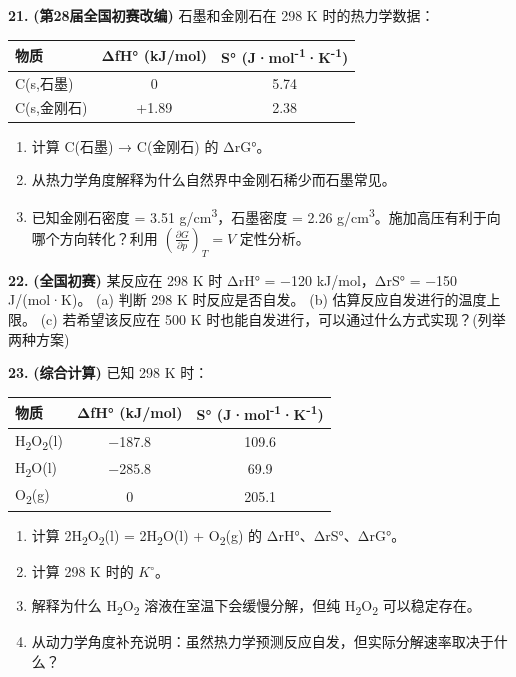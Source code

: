 \textbf{21.} \textbf{(第28届全国初赛改编)} 石墨和金刚石在 298 K 时的热力学数据：

{\def\LTcaptype{none} %
\begin{longtable}[]{@{}lcc@{}}
\toprule\noalign{}
物质 & ΔfH° (kJ/mol) & S° (J·mol\textsuperscript{-1}·K\textsuperscript{-1}) \\
\midrule\noalign{}
\endhead
\bottomrule\noalign{}
\endlastfoot
C(s,石墨) & 0 & 5.74 \\
C(s,金刚石) & +1.89 & 2.38 \\
\end{longtable}
}

\begin{enumerate}
\def\labelenumi{(\alph{enumi})}
\tightlist
\item
  计算 C(石墨) → C(金刚石) 的 ΔrG°。
\item
  从热力学角度解释为什么自然界中金刚石稀少而石墨常见。
\item
  已知金刚石密度 = 3.51 g/cm\textsuperscript{3}，石墨密度 = 2.26 g/cm\textsuperscript{3}。施加高压有利于向哪个方向转化？利用 \(\left(\frac{\partial G}{\partial p}\right)_T = V\) 定性分析。
\end{enumerate}

\textbf{22.} \textbf{(全国初赛)} 某反应在 298 K 时 ΔrH° = −120 kJ/mol，ΔrS° = −150 J/(mol·K)。
(a) 判断 298 K 时反应是否自发。
(b) 估算反应自发进行的温度上限。
(c) 若希望该反应在 500 K 时也能自发进行，可以通过什么方式实现？(列举两种方案)

\textbf{23.} \textbf{(综合计算)} 已知 298 K 时：

{\def\LTcaptype{none} %
\begin{longtable}[]{@{}lcc@{}}
\toprule\noalign{}
物质 & ΔfH° (kJ/mol) & S° (J·mol\textsuperscript{-1}·K\textsuperscript{-1}) \\
\midrule\noalign{}
\endhead
\bottomrule\noalign{}
\endlastfoot
H\textsubscript{2}O\textsubscript{2}(l) & −187.8 & 109.6 \\
H\textsubscript{2}O(l) & −285.8 & 69.9 \\
O\textsubscript{2}(g) & 0 & 205.1 \\
\end{longtable}
}

\begin{enumerate}
\def\labelenumi{(\alph{enumi})}
\tightlist
\item
  计算 2H\textsubscript{2}O\textsubscript{2}(l) = 2H\textsubscript{2}O(l) + O\textsubscript{2}(g) 的 ΔrH°、ΔrS°、ΔrG°。
\item
  计算 298 K 时的 \(K^{\circ}\)。
\item
  解释为什么 H\textsubscript{2}O\textsubscript{2} 溶液在室温下会缓慢分解，但纯 H\textsubscript{2}O\textsubscript{2} 可以稳定存在。
\item
  从动力学角度补充说明：虽然热力学预测反应自发，但实际分解速率取决于什么？
\end{enumerate}

